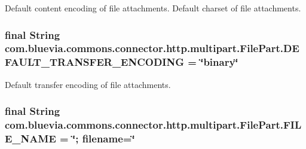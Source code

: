 \label{classcom_1_1bluevia_1_1commons_1_1connector_1_1http_1_1multipart_1_1FilePart_acb902bd4273c47c862a713f482e00e7e}
Default content encoding of file attachments. Default charset of file attachments. \hypertarget{classcom_1_1bluevia_1_1commons_1_1connector_1_1http_1_1multipart_1_1FilePart_a8af46da7bcd44774a2926fcabd1935d5}{
\subsubsection[{DEFAULT\_\-TRANSFER\_\-ENCODING}]{\setlength{\rightskip}{0pt plus 5cm}final String {\bf com.bluevia.commons.connector.http.multipart.FilePart.DEFAULT\_\-TRANSFER\_\-ENCODING} = \char`\"{}binary\char`\"{}}}
\label{classcom_1_1bluevia_1_1commons_1_1connector_1_1http_1_1multipart_1_1FilePart_a8af46da7bcd44774a2926fcabd1935d5}
Default transfer encoding of file attachments. \hypertarget{classcom_1_1bluevia_1_1commons_1_1connector_1_1http_1_1multipart_1_1FilePart_a181342379932cfacadee5b1f8c0113c7}{
\subsubsection[{FILE\_\-NAME}]{\setlength{\rightskip}{0pt plus 5cm}final String {\bf com.bluevia.commons.connector.http.multipart.FilePart.FILE\_\-NAME} = \char`\"{}; filename=\char`\"{}}}
\label{classcom_1_1bluevia_1_1commons_1_1connector_1_1http_1_1multipart_1_1FilePart_a181342379932cfacadee5b1f8c0113c7}
